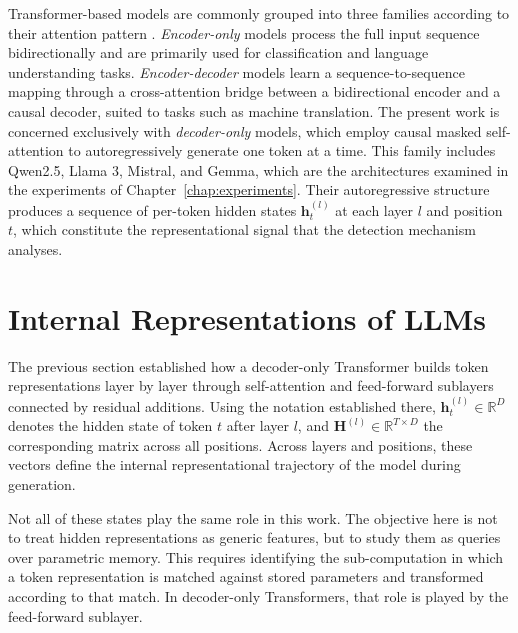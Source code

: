 Transformer-based models are commonly grouped into three families according to their
attention pattern \citep{tunstall2022natural}. \emph{Encoder-only} models process
the full input sequence bidirectionally and are primarily used for classification
and language understanding tasks. \emph{Encoder-decoder} models learn a
sequence-to-sequence mapping through a cross-attention bridge between a bidirectional
encoder and a causal decoder, suited to tasks such as machine translation. The
present work is concerned exclusively with \emph{decoder-only} models, which employ
causal masked self-attention to autoregressively generate one token at a time. This family includes Qwen2.5, Llama 3, Mistral, and Gemma, which are the architectures examined in the experiments of Chapter~\ref{chap:experiments}. Their autoregressive structure
produces a sequence of per-token hidden states $\mathbf{h}_t^{(l)}$ at each layer
$l$ and position $t$, which constitute the representational signal that the
detection mechanism analyses.
\section{Internal Representations of LLMs}
\label{sec:internal_representations}

The previous section established how a decoder-only Transformer builds token
representations layer by layer through self-attention and feed-forward sublayers
connected by residual additions. Using the notation established there,
$\mathbf{h}_t^{(l)} \in \mathbb{R}^D$ denotes the hidden state of token $t$ after
layer $l$, and $\mathbf{H}^{(l)} \in \mathbb{R}^{T \times D}$ the corresponding
matrix across all positions. Across layers and positions, these vectors define the
internal representational trajectory of the model during generation.

Not all of these states play the same role in this work. The objective here is not
to treat hidden representations as generic features, but to study them as queries
over parametric memory. This requires identifying the sub-computation in which a
token representation is matched against stored parameters and transformed according
to that match. In decoder-only Transformers, that role is played by the feed-forward
sublayer.

